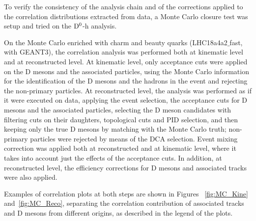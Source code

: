 \label{MCclosure}
To verify the consistency of the analysis chain and of the corrections applied to the  correlation distributions extracted from data, a Monte Carlo closure test was setup and tried on the ${\rm D^0}$-h analysis.

On the Monte Carlo enriched with charm and beauty quarks (LHC18a4a2$\_$fast, with GEANT3), the correlation analysis was performed both at kinematic level and at reconstructed level. At kinematic level, only acceptance cuts were applied on the D mesons and the associated particles, using the Monte Carlo information for the identification of the D mesons and the hadrons in the event and rejecting the non-primary particles. At reconstructed level, the analysis was performed as if it were executed on data, applying the event selection, the acceptance cuts for D mesons and the associated particles, selecting the D meson candidates with filtering cuts on their daughters, topological cuts and PID selection, and then keeping only the true D mesons by matching with the Monte Carlo truth; non-primary particles were rejected by means of the DCA selection. Event mixing correction was applied both at reconstructed and at kinematic level, where it takes into account just the effects of the acceptance cuts. In addition, at reconstructed level, the efficiency corrections for D mesons and associated tracks were also applied.

Examples of correlation plots at both steps are shown in Figures ~\ref{fig:MC_Kine} and~\ref{fig:MC_Reco}, separating the correlation contribution of associated tracks and D mesons from different origins, as described in the legend of the plots.

